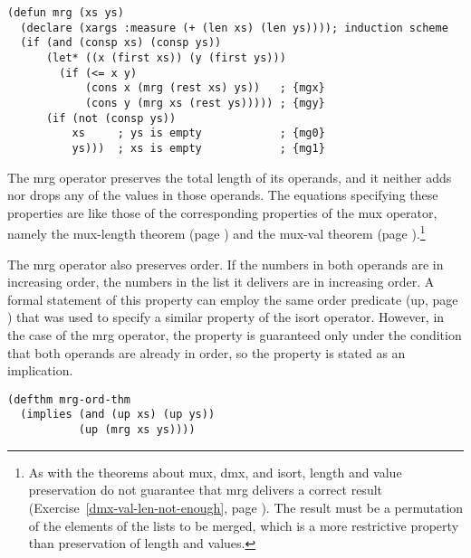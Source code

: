 \label{defun:mrg}
\begin{code}
\begin{verbatim}
(defun mrg (xs ys)
  (declare (xargs :measure (+ (len xs) (len ys)))); induction scheme
  (if (and (consp xs) (consp ys))
      (let* ((x (first xs)) (y (first ys)))
        (if (<= x y)
            (cons x (mrg (rest xs) ys))   ; {mgx}
            (cons y (mrg xs (rest ys))))) ; {mgy}
      (if (not (consp ys))
          xs     ; ys is empty            ; {mg0}
          ys)))  ; xs is empty            ; {mg1}
\end{verbatim}
\end{code}

The \textsf{mrg} operator preserves the total length of its operands,
and it neither adds nor drops any of the values in those operands.
The equations specifying these properties are like those of the
corresponding properties of the \textsf{mux} operator, namely
the mux-length theorem (page \pageref{mux-length-thm}) and the
mux-val theorem (page \pageref{thm:mux-val}).\footnote{As
with the theorems about
\textsf{mux}, \textsf{dmx}, and \textsf{isort}, length and value preservation
do not guarantee that \textsf{mrg} delivers a correct result
(Exercise~\ref{dmx-val-len-not-enough}, page \pageref{dmx-val-len-not-enough}).
The result must be a permutation
of the elements of the lists to be merged,
which is a more restrictive property than
preservation of length and values.}

The \textsf{mrg} operator also preserves order.
If the numbers in both operands are in increasing order,
the numbers in the list it delivers are in increasing order.
A formal statement of this property can employ the same order predicate
(\textsf{up}, page \pageref{defun:up}) that was used to specify a
similar property of the \textsf{isort} operator.
However, in the case of the \textsf{mrg} operator,
the property is guaranteed only under the condition
that both operands are already in order,
so the property is stated as an implication.
\label{defthm:mrg-ord}
\begin{code}
\begin{verbatim}
(defthm mrg-ord-thm
  (implies (and (up xs) (up ys))
           (up (mrg xs ys))))
\end{verbatim}
\end{code}

